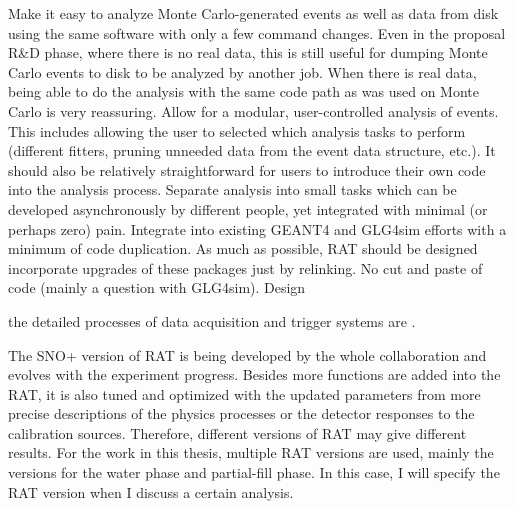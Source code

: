 Make it easy to analyze Monte Carlo-generated events as well as data from disk using the same software with only a few command changes. Even in the proposal R\&D phase, where there is no real data, this is still useful for dumping Monte Carlo events to disk to be analyzed by another job. When there is real data, being able to do the analysis with the same code path as was used on Monte Carlo is very reassuring.
Allow for a modular, user-controlled analysis of events. This includes allowing the user to selected which analysis tasks to perform (different fitters, pruning unneeded data from the event data structure, etc.). It should also be relatively straightforward for users to introduce their own code into the analysis process.
Separate analysis into small tasks which can be developed asynchronously by different people, yet integrated with minimal (or perhaps zero) pain.
Integrate into existing GEANT4 and GLG4sim efforts with a minimum of code duplication. As much as possible, RAT should be designed incorporate upgrades of these packages just by relinking. No cut and paste of code (mainly a question with GLG4sim).
Design

the detailed processes of data acquisition and trigger systems are \cite{whitepaper}.

The SNO+ version of RAT is being developed by the whole collaboration and evolves with the experiment progress.
Besides more functions are added into the RAT, it is also tuned and optimized with the updated parameters from more precise descriptions of the physics processes or the detector responses to the calibration sources. Therefore, different versions of RAT may give different results. For the work in this thesis, multiple RAT versions are used, mainly the versions for the water phase and partial-fill phase. In this case, I will specify the RAT version when I discuss a certain analysis.
\cite{ratManual}